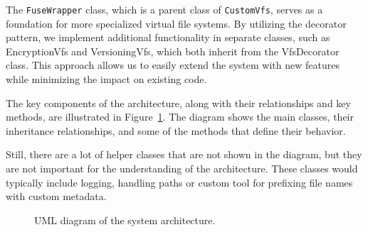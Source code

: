The \texttt{FuseWrapper} class, which is a parent class of \texttt{CustomVfs}, serves as a foundation for more specialized virtual file systems.
By utilizing the decorator pattern, we implement additional functionality in separate classes, such as EncryptionVfs and VersioningVfs, which both inherit from the VfsDecorator class.
This approach allows us to easily extend the system with new features while minimizing the impact on existing code.

The key components of the architecture, along with their relationships and key methods, are illustrated in Figure~\ref{fig:uml_diagram}.
The diagram shows the main classes, their inheritance relationships, and some of the methods that define their behavior.

Still, there are a lot of helper classes that are not shown in the diagram, but they are not important for the understanding of the architecture.
These classes would typically include logging, handling paths or custom tool for prefixing file names with custom metadata.

\begin{figure}[ht]
    \centering
    \scalebox{1}{
        
    }
    \vspace{15pt}
    \caption{UML diagram of the system architecture.}
    \label{fig:uml_diagram}
\end{figure}